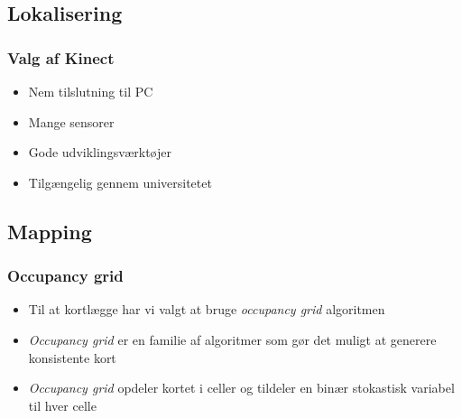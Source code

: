 \subsection{Lokalisering}
\begin{frame}
\frametitle{Valg af Kinect}
\begin{itemize}
\item Nem tilslutning til PC
\item Mange sensorer
\item Gode udviklingsværktøjer
\item Tilgængelig gennem universitetet
\end{itemize}
\end{frame}
\subsection{Mapping}
\begin{frame}
\frametitle{Occupancy grid}
\begin{itemize}
\item Til at kortlægge har vi valgt at bruge \textit{occupancy grid} algoritmen
\item \textit{Occupancy grid} er en familie af algoritmer som gør det muligt at generere konsistente kort
\item \textit{Occupancy grid} opdeler kortet i celler og tildeler en binær stokastisk variabel til hver celle
\end{itemize}
\end{frame}